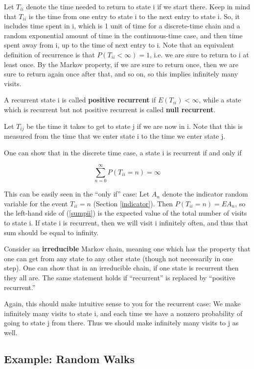 Let $T_{ii}$ denote the time needed to return to state i if we start
there.  Keep in mind that $T_{ii}$ is the time from one entry to state i
to the next entry to state i.  So, it includes time spent in i, which is
1 unit of time for a discrete-time chain and a random exponential amount
of time in the continuous-time case, and then time spent away from i, up
to the time of next entry to i.  Note that an equivalent definition of
recurrence is that $P(T_{ii}<\infty )=1$, i.e.  we are sure to return to
i at least once.  By the Markov property, if we are sure to return once,
then we are sure to return again once after that, and so on, so this
implies infinitely many visits.

A recurrent state i is called \textbf{positive recurrent} if
$E(T_{ii})<\infty$, while a state which is recurrent but not positive
recurrent is called \textbf{null recurrent}. 

Let $T_{ij}$ be the time it takes to get to state j if we are now in i.
Note that this is measured from the time that we enter state i to the
time we enter state j.

One can show that in the discrete time case, a state i is recurrent if
and only if

\begin{equation}
\label{sumpii}
\sum_{n=0}^{\infty} P(T_{ii} = n) = \infty
\end{equation}

This can be easily seen in the ``only if'' case:   Let $A_n$ denote the
indicator random variable for the event $T_{ii} = n$ (Section
\ref{indicator}).  Then $P(T_{ii} = n) = EA_n$, so the left-hand side of
(\ref{sumpii}) is the expected value of the total number of visits to
state i.  If state i is recurrent, then we will visit i infinitely
often, and thus that sum should be equal to infinity.

Consider an \textbf{irreducible} Markov chain, meaning one which has the
property that one can get from any state to any other state (though not
necessarily in one step).  One can show that in an irreducible chain, if
one state is recurrent then they all are.  The same statement holds if
``recurrent'' is replaced by ``positive recurrent.''

Again, this should make intuitive sense to you for the recurrent case:
We make infinitely many visits to state i, and each time we have a
nonzero probability of going to state j from there.  Thus we should make
infinitely many visits to j as well.

\subsection{Example:  Random Walks}

